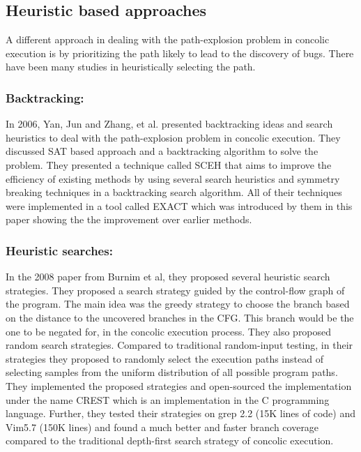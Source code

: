 \documentclass[ runningheads,
               a4paper]{llncs}
\begin{document}


\subsection{Heuristic based approaches}
A different approach in dealing with the path-explosion problem in concolic execution is by prioritizing the path likely to lead to the discovery of bugs. There have been many studies in heuristically selecting the path.


\subsubsection{Backtracking:}
In 2006, Yan, Jun and Zhang, et al. presented \cite{yan2006backtracking} backtracking ideas and search heuristics to deal with the path-explosion problem in concolic execution. They discussed SAT based approach and a backtracking algorithm to solve the problem. They presented a technique called SCEH that aims to improve the efficiency of existing methods by using several search heuristics and symmetry breaking techniques in a backtracking search algorithm. All of their techniques were implemented in a tool called EXACT which was introduced by them in this paper showing the the improvement over earlier methods.


\subsubsection{Heuristic searches:}
In the 2008 paper \cite{kousik2008heuristic} from Burnim et al, they proposed several heuristic search strategies. They proposed a search strategy guided by the control-flow graph of the program. The main idea was the greedy strategy to choose the branch based on the distance to the uncovered branches in the CFG. This branch would be the one to be negated for, in the concolic execution process. They also proposed random search strategies. Compared to traditional random-input testing, in their strategies they proposed to randomly select the execution paths instead of selecting samples from the uniform distribution of all possible program paths. They implemented the proposed strategies and open-sourced the implementation under the name CREST which is an implementation in the C programming language. Further, they tested their strategies on grep 2.2 (15K lines of code) and Vim5.7 (150K lines) and found a much better and faster branch coverage compared to the traditional depth-first search strategy of concolic execution.
\end{document}
